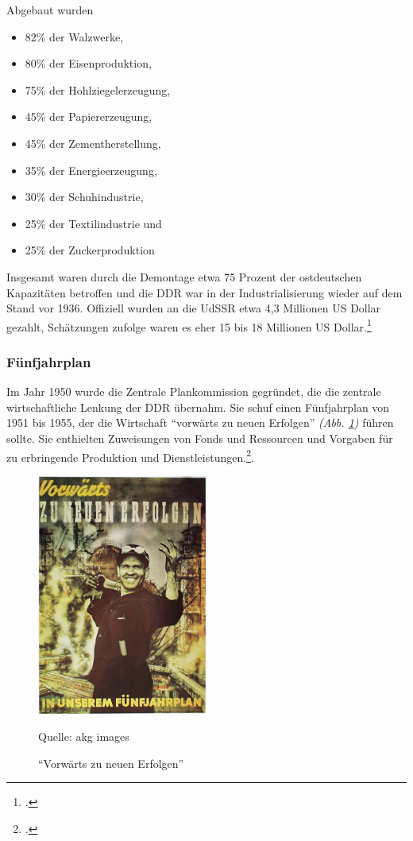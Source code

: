 \documentclass[12pt,a4paper]{article}
\begin{document}
Abgebaut wurden
\begin{itemize}
    \item 82\% der Walzwerke,
    \item 80\% der Eisenproduktion,
    \item 75\% der Hohlziegelerzeugung,
    \item 45\% der Papiererzeugung,
    \item 45\% der Zementherstellung,
    \item 35\% der Energieerzeugung,
    \item 30\% der Schuhindustrie,
    \item 25\% der Textilindustrie und
    \item 25\% der Zuckerproduktion
\end{itemize}

Insgesamt waren durch die Demontage etwa 75 Prozent der ostdeutschen Kapazitäten betroffen und die DDR war in der Industrialisierung wieder auf dem Stand vor 1936.
Offiziell wurden an die UdSSR etwa 4,3 Millionen US Dollar gezahlt, Schätzungen zufolge waren es eher 15 bis 18 Millionen US Dollar.\footcite{wiki:geschddr}


\subsubsection{Fünfjahrplan}
\label{fuenfjahr}

Im Jahr 1950 wurde die Zentrale Plankommission gegründet, die die zentrale wirtschaftliche Lenkung der DDR übernahm.
Sie schuf einen Fünfjahrplan von 1951 bis 1955, der die Wirtschaft \enquote{vorwärts zu neuen Erfolgen} \textit{(Abb. \ref{img:fuenfjahrplan})} führen sollte. Sie enthielten Zuweisungen von Fonds und Ressourcen und Vorgaben für zu erbringende Produktion und Dienstleistungen.\footcite{wiki:fuenfjahrplan}.

\begin{figure}[hbp]
    \centering
    \includegraphics[width=0.5\textwidth]{Bilder/fuenfjahrplan.jpg}
    \caption{\enquote{Vorwärts zu neuen Erfolgen}}
    Quelle: akg images
    \label{img:fuenfjahrplan}
\end{figure}
\end{document}
